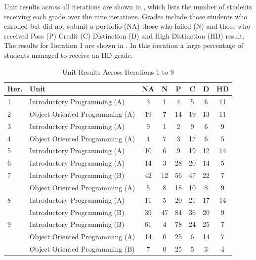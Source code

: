 Unit results across all iterations are shown in , which lists the number of students receiving each grade over the nine iterations. Grades include those students who enrolled but did not submit a portfolio (NA) those who failed (N) and those who received Pass (P) Credit (C) Distinction (D) and High Distinction (HD) result. The results for Iteration 1 are shown in . In this iteration a large percentage of students managed to receive an HD grade.

\begin{table}[p]
  \footnotesize
  \renewcommand{\arraystretch}{1.3}
  \caption{Unit Results Across Iterations 1 to 9}
  \label{tbl:unit_results}
  \centering
    \begin{tabular}{l|l|c|c|c|c|c|c}
        Iter. & Unit    & NA & N  & P  & C  & D  & HD \\ \hline
        1         & Introductory Programming (A)  & 3  & 1  & 4  & 5  & 6  & 11 \\ \hline
        2         & Object Oriented Programming (A) & 19 & 7  & 14 & 19 & 13 & 11 \\ \hline
        3         & Introductory Programming (A)  & 9  & 1  & 2  & 9  & 6  & 9  \\ \hline
        4         & Object Oriented Programming (A) & 4  & 7  & 3  & 17 & 6  & 5  \\ \hline
        5         & Introductory Programming (A)  & 10 & 6  & 9  & 19 & 12 & 14 \\ \hline
        6         & Introductory Programming (A)  & 14 & 3  & 28 & 20 & 14 & 5  \\ \hline
        7         & Introductory Programming (B)  & 42 & 12 & 56 & 47 & 22 & 7  \\ 
        ~         & Object Oriented Programming (A) & 5  & 8  & 18 & 10 & 8  & 9  \\ \hline
        8         & Introductory Programming (A)  & 11 & 5  & 20 & 21 & 17 & 14 \\ 
        ~         & Introductory Programming (B)  & 39 & 47 & 84 & 36 & 20 & 9  \\ \hline
        9         & Introductory Programming (B)  & 61 & 4  & 78 & 24 & 25 & 7  \\ 
        ~         & Object Oriented Programming (A) & 14 & 0  & 25 & 6  & 14 & 7  \\ 
        ~         & Object Oriented Programming (B) & 7  & 0  & 25 & 5  & 3  & 4  
    \end{tabular}
\end{table}

